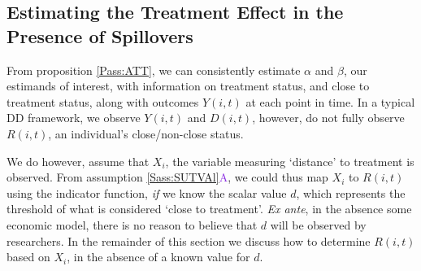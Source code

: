 \documentclass{article}
\newcommand{\asref}[2]{\ref{#1}{\textcolor{BlueViolet}{#2}}}
\begin{document}
\begin{spacing}{1.3}
\subsection{Estimating the Treatment Effect in the Presence of Spillovers}
\label{Ssscn:TE}
From proposition \ref{Pass:ATT}, we can consistently estimate $\alpha$
and $\beta$, our estimands of interest, with information on treatment
status, and close to treatment status, along with outcomes $Y(i,t)$ at
each point in time.  In a typical DD framework, we
observe $Y(i,t)$ and $D(i,t)$, however, do not fully observe $R(i,t)$,
an individual's close/non-close status.

We do however, assume that $X_i$, the variable measuring `distance' to
treatment is observed.  From assumption \asref{Sass:SUTVAl}{A}, we could
thus map $X_i$ to $R(i,t)$ using the indicator function, \emph{if} we
know the scalar value $d$, which represents the threshold of what is
considered `close to treatment'.  \emph{Ex ante}, in the absence some
economic model, there is no reason to believe that $d$ will be
observed by researchers.  In the remainder of this section we discuss
how to determine $R(i,t)$ based on $X_i$, in the absence of a known
value for $d$.


\end{spacing}
\end{document}
